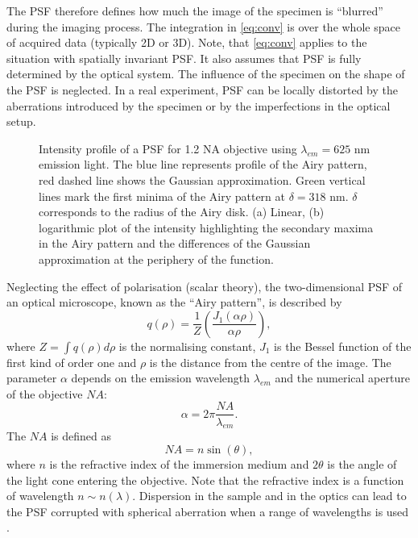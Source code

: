 The PSF therefore defines how much the image of the specimen is ``blurred'' during the imaging process. The integration in \autoref{eq:conv} is over the whole space of acquired data (typically 2D or 3D). Note, that \autoref{eq:conv} applies to the situation with spatially invariant PSF. It also assumes that PSF is fully determined by the optical system. The influence of the specimen on the shape of the PSF is neglected. In a real experiment, PSF can be locally distorted by the aberrations introduced by the specimen or by the imperfections in the optical setup.

\begin{figure}[!bht]
	\centering
	\newcommand{\wf}{.48\textwidth}
	\caption{Intensity profile of a PSF for 1.2 NA objective using $\lambda_{em}=625$ nm emission light. The blue line represents profile of the Airy pattern, red dashed line shows the Gaussian approximation. Green vertical lines mark the first minima of the Airy pattern at $\delta=318$ nm. $\delta$ corresponds to the radius of the Airy disk. (a) Linear, (b) logarithmic plot of the intensity highlighting the secondary maxima in the Airy pattern and the differences of the Gaussian approximation at the periphery of the function.}
	\label{fig:PSF}
\end{figure}
%
Neglecting the effect of polarisation (scalar theory), the two-dimensional PSF of an optical microscope, known as the ``Airy pattern'', is described by \cite{Born1999}
%
\begin{equation}
	q(\rho)=\frac{1}{Z}\left(\frac{J_1(\alpha \rho)}{\alpha \rho}\right),
\end{equation}
%
where $Z=\int q(\rho) d\rho$ is the normalising constant, $J_1$ is the Bessel function of the first kind of order one and $\rho$ is the distance from the centre of the image. The parameter $\alpha$ depends on the emission wavelength $\lambda_{em}$ and the numerical aperture of the objective $\unit{NA}$:
%
\begin{equation}
	\alpha=2\pi\frac{\unit{NA}}{\lambda_{em}}.
\end{equation}
% 
The $\unit{NA}$ is defined as
\begin{equation}
	\unit{NA}=n\sin(\theta),
	\label{eq:NA}
\end{equation}
%
where $n$ is the refractive index of the immersion medium and $2\theta$ is the angle of the light cone entering the objective. Note that the refractive index is a function of wavelength $n\sim n(\lambda)$. Dispersion in the sample and in the optics can lead to the PSF corrupted with spherical aberration when a range of wavelengths is used \cite{SCALETTAR1996}.

